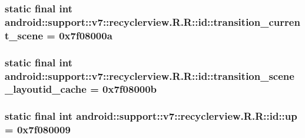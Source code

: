 \hypertarget{classandroid_1_1support_1_1v7_1_1recyclerview_1_1_r_1_1id_5750f412107fc8674634fd7961377249}{
\subsubsection[{transition\_\-current\_\-scene}]{\setlength{\rightskip}{0pt plus 5cm}static final int android::support::v7::recyclerview.R.R::id::transition\_\-current\_\-scene = 0x7f08000a}}
\label{classandroid_1_1support_1_1v7_1_1recyclerview_1_1_r_1_1id_5750f412107fc8674634fd7961377249}


\hypertarget{classandroid_1_1support_1_1v7_1_1recyclerview_1_1_r_1_1id_0a1186bce6cec48734ab3296fa125c6c}{
\subsubsection[{transition\_\-scene\_\-layoutid\_\-cache}]{\setlength{\rightskip}{0pt plus 5cm}static final int android::support::v7::recyclerview.R.R::id::transition\_\-scene\_\-layoutid\_\-cache = 0x7f08000b}}
\label{classandroid_1_1support_1_1v7_1_1recyclerview_1_1_r_1_1id_0a1186bce6cec48734ab3296fa125c6c}


\hypertarget{classandroid_1_1support_1_1v7_1_1recyclerview_1_1_r_1_1id_d1fafac92497ec8d0e3e1ec46b0359f8}{
\subsubsection[{up}]{\setlength{\rightskip}{0pt plus 5cm}static final int android::support::v7::recyclerview.R.R::id::up = 0x7f080009}}
\label{classandroid_1_1support_1_1v7_1_1recyclerview_1_1_r_1_1id_d1fafac92497ec8d0e3e1ec46b0359f8}


